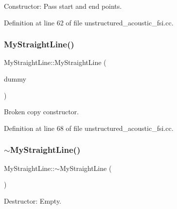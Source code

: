 Constructor\+: Pass start and end points. 



Definition at line 62 of file unstructured\+\_\+acoustic\+\_\+fsi.\+cc.

\mbox{\label{classMyStraightLine_a4c42312f35a3cf72f2f39e88ad28202f}} 
\subsubsection{\texorpdfstring{My\+Straight\+Line()}{MyStraightLine()}\hspace{0.1cm}{\footnotesize\ttfamily [2/2]}}
{\footnotesize\ttfamily My\+Straight\+Line\+::\+My\+Straight\+Line (\begin{DoxyParamCaption}\item[{const \hyperlink{classMyStraightLine}{My\+Straight\+Line} \&}]{dummy }\end{DoxyParamCaption})\hspace{0.3cm}{\ttfamily [inline]}}



Broken copy constructor. 



Definition at line 68 of file unstructured\+\_\+acoustic\+\_\+fsi.\+cc.

\mbox{\label{classMyStraightLine_ae2f9a5860652a726b2f4dc94d1332ef1}} 
\subsubsection{\texorpdfstring{$\sim$\+My\+Straight\+Line()}{~MyStraightLine()}}
{\footnotesize\ttfamily My\+Straight\+Line\+::$\sim$\+My\+Straight\+Line (\begin{DoxyParamCaption}{ }\end{DoxyParamCaption})\hspace{0.3cm}{\ttfamily [inline]}}



Destructor\+: Empty. 



